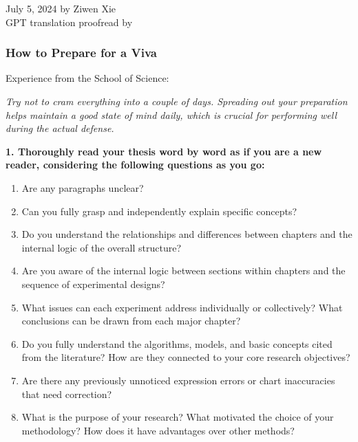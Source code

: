 \begin{flushright}
    July 5, 2024 by Ziwen Xie \\
    GPT translation proofread by \Shiyao
\end{flushright}

\subsubsection{How to Prepare for a Viva}

Experience from the School of Science:

\textit{Try not to cram everything into a couple of days. Spreading out your preparation helps maintain a good state of mind daily, which is crucial for performing well during the actual defense.}

\textbf{1. Thoroughly read your thesis word by word as if you are a new reader, considering the following questions as you go:}
\begin{enumerate}
    \item Are any paragraphs unclear?
    \item Can you fully grasp and independently explain specific concepts?
    \item Do you understand the relationships and differences between chapters and the internal logic of the overall structure?
    \item Are you aware of the internal logic between sections within chapters and the sequence of experimental designs?
    \item What issues can each experiment address individually or collectively? What conclusions can be drawn from each major chapter?
    \item Do you fully understand the algorithms, models, and basic concepts cited from the literature? How are they connected to your core research objectives?
    \item Are there any previously unnoticed expression errors or chart inaccuracies that need correction?
    \item What is the purpose of your research? What motivated the choice of your methodology? How does it have advantages over other methods?
\end{enumerate}

